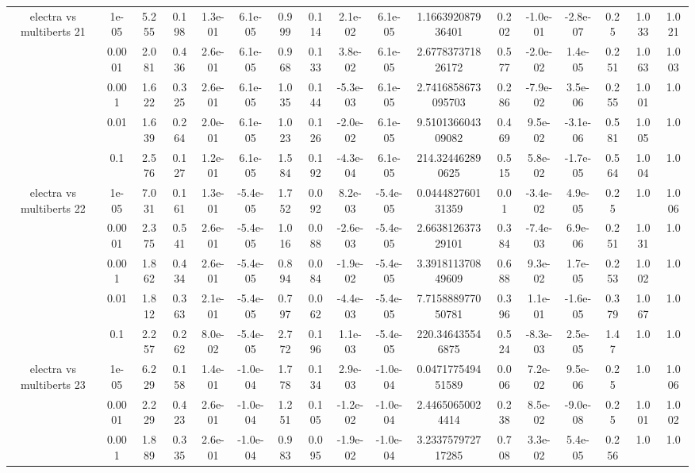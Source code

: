\begin{tabular}{|c|c|c|c|c|c|c|c|c|c|c|c|c|c|c|c|c|}
\hline
\multirow{5}{*}{electra  vs multiberts 21} & 1e-05 & 5.255 & 0.198 & 1.3e-01 & 6.1e-05 & 0.999 & 0.114 & 2.1e-02 & 6.1e-05 & 1.166392087936401 & 0.202 & -1.0e-01 & -2.8e-07 & 0.25 & 1.033 & 1.021 \\
 & 0.0001 & 2.081 & 0.436 & 2.6e-01 & 6.1e-05 & 0.968 & 0.133 & 3.8e-02 & 6.1e-05 & 2.677837371826172 & 0.577 & -2.0e-02 & 1.4e-05 & 0.251 & 1.063 & 1.003 \\
 & 0.001 & 1.622 & 0.325 & 2.6e-01 & 6.1e-05 & 1.035 & 0.144 & -5.3e-03 & 6.1e-05 & 2.7416858673095703 & 0.286 & -7.9e-02 & 3.5e-06 & 0.255 & 1.001 & 1.0 \\
 & 0.01 & 1.639 & 0.264 & 2.0e-01 & 6.1e-05 & 1.023 & 0.126 & -2.0e-02 & 6.1e-05 & 9.510136604309082 & 0.469 & 9.5e-02 & -3.1e-06 & 0.581 & 1.005 & 1.0 \\
 & 0.1 & 2.576 & 0.127 & 1.2e-01 & 6.1e-05 & 1.584 & 0.192 & -4.3e-04 & 6.1e-05 & 214.324462890625 & 0.515 & 5.8e-02 & -1.7e-05 & 0.564 & 1.004 & 1.0 \\
\hline
\multirow{5}{*}{electra  vs multiberts 22} & 1e-05 & 7.031 & 0.161 & 1.3e-01 & -5.4e-05 & 1.752 & 0.092 & 8.2e-03 & -5.4e-05 & 0.044482760131359 & 0.01 & -3.4e-02 & 4.9e-05 & 0.25 & 1.0 & 1.006 \\
 & 0.0001 & 2.375 & 0.541 & 2.6e-01 & -5.4e-05 & 1.016 & 0.088 & -2.6e-03 & -5.4e-05 & 2.663812637329101 & 0.384 & -7.4e-03 & 6.9e-06 & 0.251 & 1.031 & 1.0 \\
 & 0.001 & 1.862 & 0.434 & 2.6e-01 & -5.4e-05 & 0.894 & 0.084 & -1.9e-02 & -5.4e-05 & 3.391811370849609 & 0.688 & 9.3e-02 & 1.7e-05 & 0.253 & 1.002 & 1.0 \\
 & 0.01 & 1.812 & 0.363 & 2.1e-01 & -5.4e-05 & 0.797 & 0.062 & -4.4e-03 & -5.4e-05 & 7.715888977050781 & 0.396 & 1.1e-01 & -1.6e-05 & 0.379 & 1.067 & 1.0 \\
 & 0.1 & 2.257 & 0.262 & 8.0e-02 & -5.4e-05 & 2.772 & 0.196 & 1.1e-03 & -5.4e-05 & 220.346435546875 & 0.524 & -8.3e-03 & 2.5e-05 & 1.47 & 1.0 & 1.0 \\
\hline
\multirow{5}{*}{electra  vs multiberts 23} & 1e-05 & 6.229 & 0.158 & 1.4e-01 & -1.0e-04 & 1.778 & 0.134 & 2.9e-03 & -1.0e-04 & 0.047177549451589 & 0.006 & 7.2e-02 & 9.5e-06 & 0.25 & 1.0 & 1.006 \\
 & 0.0001 & 2.229 & 0.423 & 2.6e-01 & -1.0e-04 & 1.251 & 0.105 & -1.2e-02 & -1.0e-04 & 2.44650650024414 & 0.238 & 8.5e-02 & -9.0e-08 & 0.25 & 1.001 & 1.002 \\
 & 0.001 & 1.889 & 0.335 & 2.6e-01 & -1.0e-04 & 0.983 & 0.095 & -1.9e-02 & -1.0e-04 & 3.233757972717285 & 0.708 & 3.3e-02 & 5.4e-05 & 0.256 & 1.0 & 1.0 \\

\end{tabular}
